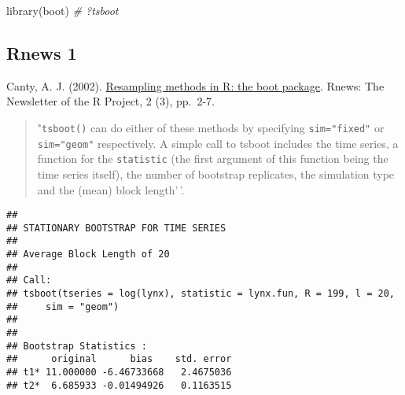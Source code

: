 \documentclass[
]{book}
\newenvironment{Shaded}{\begin{snugshade}}{\end{snugshade}}
\newcommand{\AttributeTok}[1]{\textcolor[rgb]{0.77,0.63,0.00}{#1}}
\newcommand{\CommentTok}[1]{\textcolor[rgb]{0.56,0.35,0.01}{\textit{#1}}}
\newcommand{\ControlFlowTok}[1]{\textcolor[rgb]{0.13,0.29,0.53}{\textbf{#1}}}
\newcommand{\DecValTok}[1]{\textcolor[rgb]{0.00,0.00,0.81}{#1}}
\newcommand{\FunctionTok}[1]{\textcolor[rgb]{0.00,0.00,0.00}{#1}}
\newcommand{\NormalTok}[1]{#1}
\newcommand{\OtherTok}[1]{\textcolor[rgb]{0.56,0.35,0.01}{#1}}
\newcommand{\SpecialCharTok}[1]{\textcolor[rgb]{0.00,0.00,0.00}{#1}}
\newcommand{\StringTok}[1]{\textcolor[rgb]{0.31,0.60,0.02}{#1}}
\theoremstyle{break}
\theoremstyle{definition}
\theoremstyle{definition}
\theoremstyle{definition}
\theoremstyle{definition}
\theoremstyle{remark}
\begin{document}
\begin{Shaded}
\begin{Highlighting}[]
\FunctionTok{library}\NormalTok{(boot)}
\CommentTok{\# ?tsboot}
\end{Highlighting}
\end{Shaded}

\hypertarget{rnews-1}{%
\subsection{Rnews 1}\label{rnews-1}}

Canty, A. J. (2002). \href{http://cran.fhcrc.org/doc/Rnews/Rnews_2002-3.pdf}{Resampling methods in R: the boot package}. Rnews: The Newsletter of the R Project, 2 (3), pp.~2-7.

\begin{quote}
"\texttt{tsboot()} can do either of these methods
by specifying \texttt{sim="fixed"} or \texttt{sim="geom"} respectively.
A simple call to tsboot includes the time
series, a function for the \texttt{statistic} (the first argument
of this function being the time series itself), the number
of bootstrap replicates, the simulation type and
the (mean) block length'\,'.
\end{quote}

\begin{Shaded}
\end{Shaded}

\begin{verbatim}
## 
## STATIONARY BOOTSTRAP FOR TIME SERIES
## 
## Average Block Length of 20 
## 
## Call:
## tsboot(tseries = log(lynx), statistic = lynx.fun, R = 199, l = 20, 
##     sim = "geom")
## 
## 
## Bootstrap Statistics :
##      original      bias    std. error
## t1* 11.000000 -6.46733668   2.4675036
## t2*  6.685933 -0.01494926   0.1163515
\end{verbatim}
\end{document}
